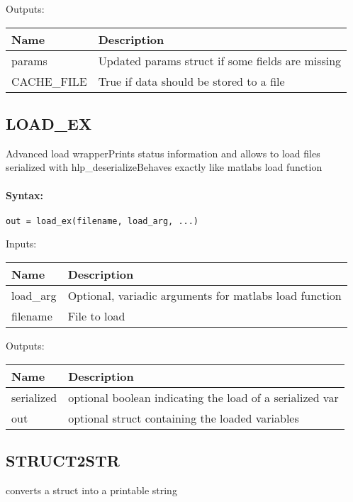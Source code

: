 \bigskip
Outputs:

\begin{tabular}{|p{}|p{}|}
\hline
\textbf{Name} & \textbf{Description} \\
\hline \hline
params & Updated params struct if some fields are missing  \\ \hline
CACHE\_FILE & True if data should be stored to a file  \\ \hline
\end{tabular}

\subsection{LOAD\_EX}

Advanced load wrapperPrints status information and allows to load files serialized with hlp\_deserializeBehaves exactly like matlabs load function

\paragraph{Syntax:} \verb|out = load_ex(filename, load_arg, ...)|

\bigskip
Inputs:

\begin{tabular}{|p{}|p{}|}
\hline
\textbf{Name} & \textbf{Description} \\
\hline \hline
load\_arg & Optional, variadic arguments for matlabs load function  \\ \hline
filename & File to load  \\ \hline
\end{tabular}

\bigskip
Outputs:

\begin{tabular}{|p{}|p{}|}
\hline
\textbf{Name} & \textbf{Description} \\
\hline \hline
serialized & optional boolean indicating the load of a serialized var  \\ \hline
out & optional struct containing the loaded variables  \\ \hline
\end{tabular}

\subsection{STRUCT2STR}

converts a struct into a printable string

